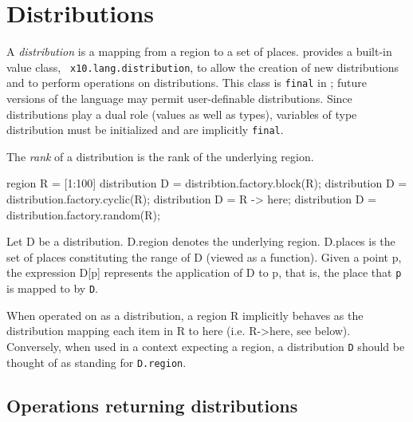 \section{Distributions}\label{XtenDistributions}

A {\em distribution} is a mapping from a region to a set of places.
{}\Xten{} provides a built-in value class, {\tt
x10.lang.distribution}, to allow the creation of new distributions and
to perform operations on distributions. This class is {\tt final} in
{}\XtenCurrVer; future versions of the language may permit
user-definable distributions. Since distributions play a dual role
(values as well as types), variables of type {\cf distribution} must
be initialized and are implicitly {\tt final}.

The {\em rank} of a distribution is the rank of the underlying region.



\begin{x10}
    region R = [1:100]
    distribution D = distribtion.factory.block(R);
    distribution D = distribution.factory.cyclic(R);
    distribution D = R -> here;
    distribution D = distribution.factory.random(R);
\end{x10}

Let {\cf D} be a distribution. {\cf D.region} denotes the underlying
region. {\cf D.places} is the set of places constituting the range of
{\cf D} (viewed as a function). Given a point {\cf p}, the expression
{\cf D[p]} represents the application of {\cf D} to {\cf p}, that is, the
place that {\tt p} is mapped to by {\tt D}.

When operated on as a distribution, a region {\cf R} implicitly
behaves as the distribution mapping each item in {\cf R} to {\cf here}
(i.e.{} {\cf R->here}, see below). Conversely, when used in a context
expecting a region, a distribution {\tt D} should be thought of as
standing for {\tt D.region}.

{}

\subsection{Operations returning distributions}

